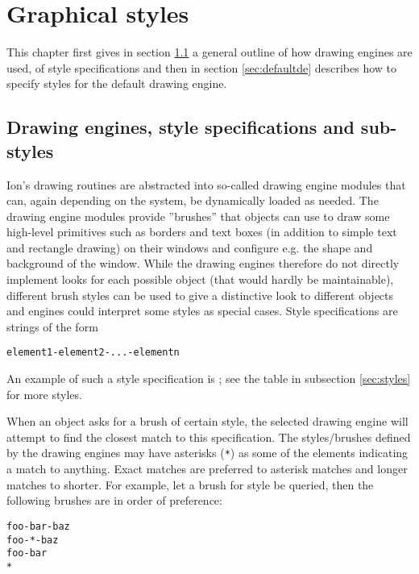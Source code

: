 
\chapter{Graphical styles}
\label{chap:gr}

This chapter first gives in section \ref{sec:engines} a general outline 
of how drawing engines are used, of style specifications and then
in section \ref{sec:defaultde} describes how to specify styles
for the default drawing engine.

\section{Drawing engines, style specifications and sub-styles}
\label{sec:engines}

Ion's drawing routines are abstracted into so-called drawing engine
modules that can, again depending on the system, be dynamically
loaded as needed. The drawing engine modules provide ''brushes''
that objects can use to draw some high-level primitives such
as borders and text boxes (in addition to simple text and rectangle
drawing) on their windows and configure e.g. the shape and 
background of the window. While the drawing engines therefore
do not directly implement looks for each possible object (that
would hardly be maintainable), different brush styles can be
used to give a distinctive look to different objects and engines
could interpret some styles as special cases. Style specifications 
are strings of the form

\begin{verbatim}
element1-element2-...-elementn
\end{verbatim}

An example of such a style specification is ;
see the table in subsection \ref{sec:styles} for more styles.

When an object asks for a brush of certain style, the selected
drawing engine will attempt to find the closest match to this
specification. The styles/brushes defined by the drawing engines 
may have asterisks (\verb!*!) as some of the elements indicating
a match to anything. Exact matches are preferred to asterisk
matches and longer matches to shorter. For example, let a brush
for style  be queried, then the following
brushes are in order of preference:

\begin{verbatim}
foo-bar-baz
foo-*-baz
foo-bar
*
\end{verbatim}

